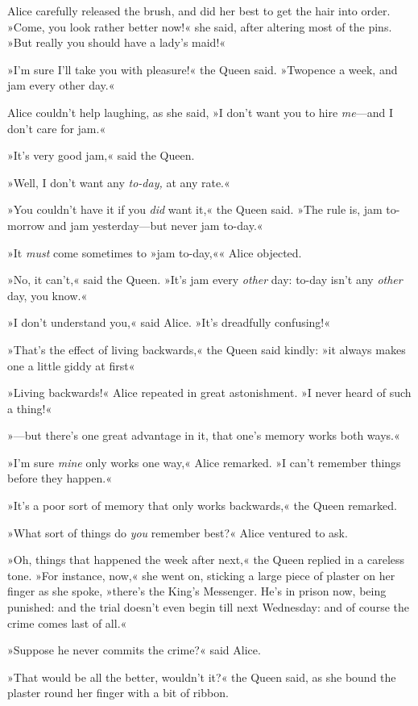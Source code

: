 Alice carefully released the brush, and did her best to get the hair into order. »Come, you look rather better now!« she said, after altering most of the pins. »But really you should have a lady's maid!«

»I'm sure I'll take you with pleasure!« the Queen said. »Twopence a week, and jam every other day.«

Alice couldn't help laughing, as she said, »I don't want you to hire \textit{me}—and I don't care for jam.«

»It's very good jam,« said the Queen.

»Well, I don't want any \textit{to-day,} at any rate.«

»You couldn't have it if you \textit{did} want it,« the Queen said. »The rule is, jam to-morrow and jam yesterday—but never jam to-day.«

»It \textit{must} come sometimes to »jam to-day,«« Alice objected.

»No, it can't,« said the Queen. »It's jam every \textit{other} day: to-day isn't any \textit{other} day, you know.«

»I don't understand you,« said Alice. »It's dreadfully confusing!«

»That's the effect of living backwards,« the Queen said kindly: »it always makes one a little giddy at first\longdash«

»Living backwards!« Alice repeated in great astonishment. »I never heard of such a thing!«

»—but there's one great advantage in it, that one's memory works both ways.«

»I'm sure \textit{mine} only works one way,« Alice remarked. »I can't remember things before they happen.«

»It's a poor sort of memory that only works backwards,« the Queen remarked.

»What sort of things do \textit{you} remember best?« Alice ventured to ask.

»Oh, things that happened the week after next,« the Queen replied in a careless tone. »For instance, now,« she went on, sticking a large piece of plaster on her finger as she spoke, »there's the King's Messenger. He's in prison now, being punished: and the trial doesn't even begin till next Wednesday: and of course the crime comes last of all.«

»Suppose he never commits the crime?« said Alice.

»That would be all the better, wouldn't it?« the Queen said, as she bound the plaster round her finger with a bit of ribbon.

